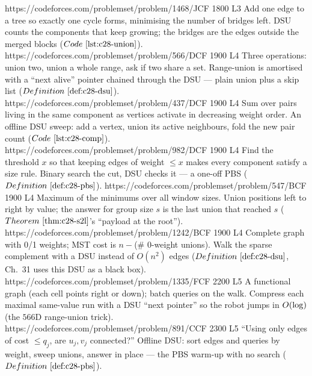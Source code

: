 \begin{mixedset}
    {https://codeforces.com/problemset/problem/1468/J}{CF 1800 L3}
    {Add one edge to a tree so exactly one cycle forms, minimising the number
     of bridges left. DSU counts the components that keep growing; the bridges
     are the edges outside the merged blocks (\(\coderef{c28-union}\)).}
    {https://codeforces.com/problemset/problem/566/D}{CF 1900 L4}
    {Three operations: union two, union a whole range, ask if two share a set.
     Range-union is amortised with a ``next alive'' pointer chained through the
     DSU --- plain union plus a skip list (\(\defref{c28-dsu}\)).}
    {https://codeforces.com/problemset/problem/437/D}{CF 1900 L4}
    {Sum over pairs living in the same component as vertices activate in
     decreasing weight order. An offline DSU sweep: add a vertex, union its
     active neighbours, fold the new pair count (\(\coderef{c28-comp}\)).}
    {https://codeforces.com/problemset/problem/982/D}{CF 1900 L4}
    {Find the threshold \(x\) so that keeping edges of weight \(\le x\) makes
     every component satisfy a size rule. Binary search the cut, DSU checks it
     --- a one-off PBS (\(\defref{c28-pbs}\)).}
    {https://codeforces.com/problemset/problem/547/B}{CF 1900 L4}
    {Maximum of the minimums over all window sizes. Union positions left to
     right by value; the answer for group size \(s\) is the last union that
     reached \(s\) (\(\thmref{c28-s2l}\)'s ``payload at the root'').}
    {https://codeforces.com/problemset/problem/1242/B}{CF 1900 L4}
    {Complete graph with 0/1 weights; MST cost is \(n-\)(\# 0-weight unions).
     Walk the sparse complement with a DSU instead of \(O(n^2)\) edges
     (\(\defref{c28-dsu}\), Ch.~31 uses this DSU as a black box).}
    {https://codeforces.com/problemset/problem/1335/F}{CF 2200 L5}
    {A functional graph (each cell points right or down); batch queries on the
     walk. Compress each maximal same-value run with a DSU ``next pointer'' so
     the robot jumps in \(O(\log)\) (the \(566\)D range-union trick).}
    {https://codeforces.com/problemset/problem/891/C}{CF 2300 L5}
    {``Using only edges of cost \(\le q_j\), are \(u_j,v_j\) connected?'' Offline
     DSU: sort edges and queries by weight, sweep unions, answer in place ---
     the PBS warm-up with no search (\(\defref{c28-pbs}\)).}

\end{mixedset}

